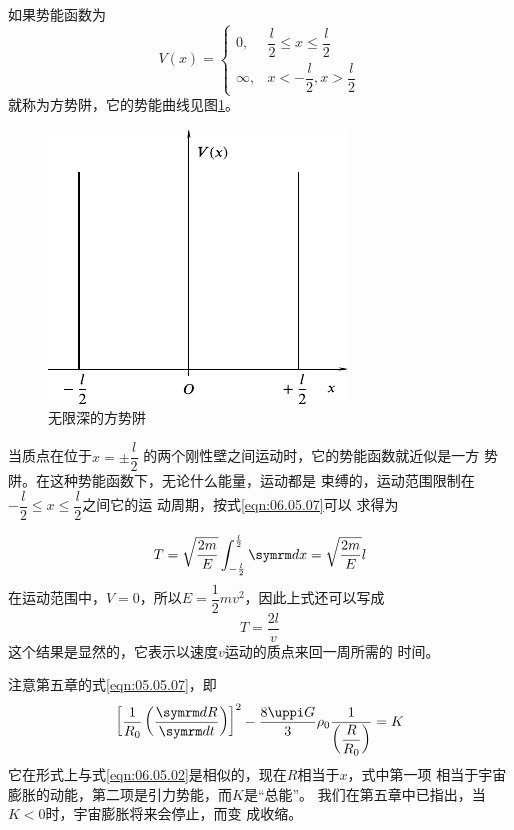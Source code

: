 \example 如果势能函数为
\begin{equation*}
  V \left( x \right) = \begin{cases}
    0,      & \dfrac { l }{ 2 } \leqslant x \leqslant \dfrac { l } { 2 } \\
    \infty, & x < - \dfrac { l } { 2 }, x > \dfrac { l } { 2 }
  \end{cases}
\end{equation*}
就称为方势阱，它的势能曲线见图\ref{fig:06.13}。

\begin{figure}
  \vspace{-2em}
  \centering
  \includegraphics{figure/fig06.13}
  \caption{无限深的方势阱}
  \label{fig:06.13}
\end{figure}
当质点在位于$ x = \pm \dfrac { l } { 2 } $
的两个刚性壁之间运动时，它的势能函数就近似是一方
势阱。在这种势能函数下，无论什么能量，运动都是
束缚的，运动范围限制在
$ - \dfrac { l } { 2 } \leqslant x \leqslant \dfrac { l } { 2 } $之间它的运
动周期，按式\eqref{eqn:06.05.07}可以
求得为

\begin{equation*}
  T = \sqrt { \frac { 2 m } { E } } \int _ { - \frac { l } { 2 } } ^ { \frac { l } { 2 } } \dif x = \sqrt { \frac { 2 m } { E } } l
\end{equation*}
在运动范围中，$ V = 0 $，所以$ E = \dfrac { 1 } { 2 } m v ^ { 2 } $，因此上式还可以写成
\begin{equation*}
  T = \frac { 2 l } { v }
\end{equation*}
这个结果是显然的，它表示以速度$ v $运动的质点来回一周所需的
时间。

\clearpage
\example 注意第五章的式\eqref{eqn:05.05.07}，即
\begin{equation}\label{eqn:06.05.08}
  \left[ \frac { 1 } { R _ { 0 } } \left( \frac { \dif R } { \dif t } \right) \right] ^ { 2 }- \frac { 8 \uppi G } { 3 } \rho _ 0 \frac { 1 } { \left( \dfrac { R } { R _ { 0 } } \right) } = K
\end{equation}
它在形式上与式\eqref{eqn:06.05.02}是相似的，现在$ R $相当于$ x $，式中第一项
相当于宇宙膨胀的动能，第二项是引力势能，而$ K $是“总能”。
我们在第五章中已指出，当$ K < 0 $时，宇宙膨胀将来会停止，而变
成收缩。

